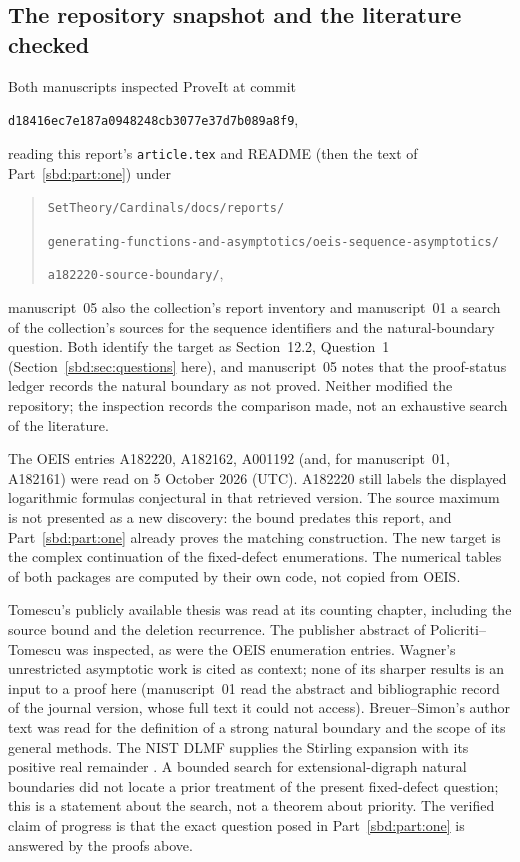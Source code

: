\documentclass[11pt,a4paper]{article}
\theoremstyle{definition}
\begin{document}
\subsection{The repository snapshot and the literature checked}
Both manuscripts inspected ProveIt at commit
\begin{center}\small
\nolinkurl{d18416ec7e187a0948248cb3077e37d7b089a8f9},
\end{center}
reading this report's \nolinkurl{article.tex} and README (then the text of
Part~\ref{sbd:part:one}) under
\begin{quote}\footnotesize\raggedright
\nolinkurl{SetTheory/Cardinals/docs/reports/}\par
\nolinkurl{generating-functions-and-asymptotics/oeis-sequence-asymptotics/}\par
\nolinkurl{a182220-source-boundary/},
\end{quote}
\noindent manuscript~05 also the collection's report inventory and manuscript~01 a
search of the collection's sources for the sequence identifiers and the
natural-boundary question. Both identify the target as Section~12.2,
Question~1 (Section~\ref{sbd:sec:questions} here), and manuscript~05 notes
that the proof-status ledger records the natural boundary as not proved.
Neither modified the repository; the inspection records the comparison
made, not an exhaustive search of the literature.

The OEIS entries A182220, A182162, A001192 (and, for manuscript~01,
A182161) were read on 5 October 2026 (UTC). A182220 still labels the
displayed logarithmic formulas conjectural in that retrieved version. The
source maximum is not presented as a new discovery: the bound predates this
report, and Part~\ref{sbd:part:one} already proves the matching
construction. The new target is the complex continuation of the
fixed-defect enumerations. The numerical tables of both packages are
computed by their own code, not copied from OEIS.

Tomescu's publicly available thesis was read at its counting chapter,
including the source bound and the deletion recurrence. The publisher
abstract of Policriti--Tomescu was inspected, as were the OEIS enumeration
entries. Wagner's unrestricted asymptotic work is cited as context; none of
its sharper results is an input to a proof here (manuscript~01 read the
abstract and bibliographic record of the journal version, whose full text
it could not access). Breuer--Simon's author text was read for the
definition of a strong natural boundary and the scope of its general
methods. The NIST DLMF supplies the Stirling expansion with its positive
real remainder \cite{dlmf}. A bounded search for extensional-digraph natural
boundaries did not locate a prior treatment of the present fixed-defect
question; this is a statement about the search, not a theorem about
priority. The verified claim of progress is that the exact question posed in
Part~\ref{sbd:part:one} is answered by the proofs above.
\end{document}

